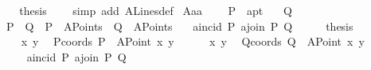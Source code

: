 \begin{isabellebody}
%
\isadelimproof
%
\endisadelimproof
%
\isatagproof
{}\isamarkupfalse%
\ {\isacharminus}{\kern0pt}\isanewline
\ \ \isamarkupfalse%
\ {\isacharquery}{\kern0pt}thesis\ \ \ \isamarkupfalse%
\ {\isacharparenleft}{\kern0pt}simp\ add{\isacharcolon}{\kern0pt}\ A{}Lines{\isacharunderscore}{\kern0pt}def{\isacharparenright}{\kern0pt}\isanewline
{}\isamarkupfalse%
%
\endisatagproof
{\isafoldproof}%
%
\isadelimproof
\isanewline
%
\endisadelimproof
\isanewline
\isanewline
\isanewline
{}\isamarkupfalse%
\ A{}{\isacharunderscore}{\kern0pt}a{}a{}{\isacharcolon}{\kern0pt}\ \isanewline
\ \ \ P\ {\isacharcolon}{\kern0pt}{\isacharcolon}{\kern0pt}\ a{}pt\isanewline
\ \ \ Q\isanewline
\ \ \ {\isachardoublequoteopen}P\ {\isasymnoteq}\ Q{\isachardoublequoteclose}\ \ {\isachardoublequoteopen}P\ {\isasymin}\ A{}Points{\isachardoublequoteclose}\ \ {\isachardoublequoteopen}Q\ {\isasymin}\ A{}Points{\isachardoublequoteclose}\isanewline
\ \ \ {\isachardoublequoteopen}a{}incid\ P\ {\isacharparenleft}{\kern0pt}a{}join\ P\ Q{\isacharparenright}{\kern0pt}{\isachardoublequoteclose}\isanewline
%
\isadelimproof
%
\endisadelimproof
%
\isatagproof
{}\isamarkupfalse%
\ {\isacharminus}{\kern0pt}\isanewline
\ \ \isamarkupfalse%
\ {\isacharquery}{\kern0pt}thesis\isanewline
\ \ \isamarkupfalse%
\ {\isacharminus}{\kern0pt}\isanewline
\ \ \ \ \isamarkupfalse%
\ x{}\ y{}\ \isamarkupfalse%
\ Pcoords{\isacharcolon}{\kern0pt}\ {\isachardoublequoteopen}P\ {\isacharequal}{\kern0pt}\ {\isacharparenleft}{\kern0pt}A{}Point\ x{}\ y{}{\isacharparenright}{\kern0pt}{\isachardoublequoteclose}\isanewline
\ \ \ \ \isamarkupfalse%
\ x{}\ y{}\ \isamarkupfalse%
\ Qcoords{\isacharcolon}{\kern0pt}\ {\isachardoublequoteopen}Q\ {\isacharequal}{\kern0pt}\ {\isacharparenleft}{\kern0pt}A{}Point\ x{}\ y{}{\isacharparenright}{\kern0pt}{\isachardoublequoteclose}\ \isanewline
\ \ \ \ \isamarkupfalse%
\ {}{\isacharcolon}{\kern0pt}\ {\isachardoublequoteopen}a{}incid\ P\ {\isacharparenleft}{\kern0pt}a{}join\ P\ Q{\isacharparenright}{\kern0pt}{\isachardoublequoteclose}\ \isanewline

\end{isabellebody}
